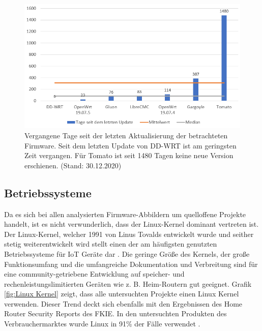 \documentclass[a4paper]{book}
\begin{document}
\begin{large}
\begin{onehalfspace}
\begin{figure}[ht]
\begin{center}
\includegraphics[scale=0.5]{images/days_since_update} 
\caption{Vergangene Tage seit der letzten Aktualisierung der betrachteten Firmware. Seit dem letzten Update von DD-WRT ist am geringsten Zeit vergangen. Für Tomato ist seit 1480 Tagen keine neue Version erschienen. (Stand: 30.12.2020)}
\label{fig:Days since Update}
\end{center}
\end{figure}	


\end{onehalfspace}



\subsection{Betriebssysteme}
\begin{onehalfspace}
Da es sich bei allen analysierten Firmware-Abbildern um quelloffene Projekte handelt, ist es nicht verwunderlich, dass der Linux-Kernel dominant vertreten ist. Der Linux-Kernel, welcher 1991 von Linus Tovalds entwickelt wurde und seither stetig weiterentwickelt wird stellt einen der am häufigsten genutzten Betriebssysteme für IoT Geräte dar \cite{Gaur.13.05.201515.05.2015}. Die geringe Größe des Kernels, der große Funktionsumfang und die umfangreiche Dokumentation und Verbreitung sind für eine community-getriebene Entwicklung auf speicher- und rechenleistungslimitierten Geräten wie z. B. Heim-Routern gut geeignet.  Grafik \ref{fig:Linux Kernel} zeigt, dass alle untersuchten Projekte einen Linux Kernel verwenden. Dieser Trend deckt sich ebenfalls mit den Ergebnissen des \glqq Home Router Security Reports\grqq{} des FKIE. In den untersuchten Produkten des Verbrauchermarktes wurde Linux in 91\% der Fälle verwendet \cite[p.~2]{PeterWeidenbachJohannesvomDorp.2020}.\\ 


\end{onehalfspace}
\end{large}
\end{document}
